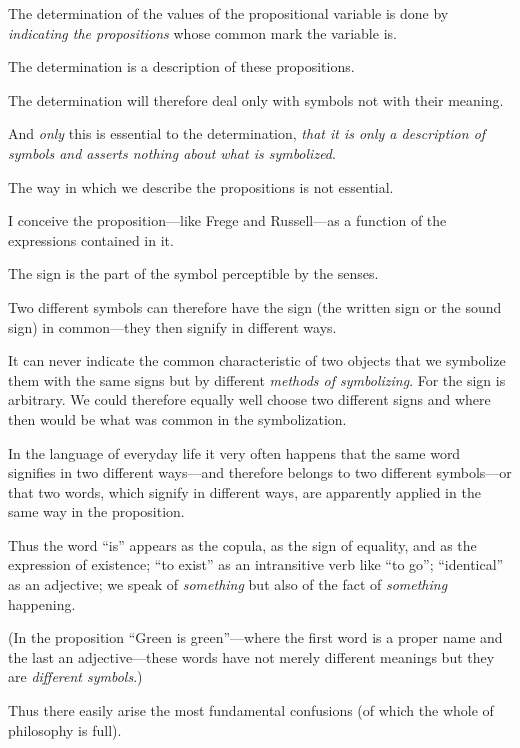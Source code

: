 {The determination of the values of the propositional
variable is done by \emph{indicating the propositions}
whose common mark the variable is.

The determination is a description of these
propositions.

The determination will therefore deal only with
symbols not with their meaning.

And \emph{only} this is essential to the determination,
\emph{that it is only a description of symbols and asserts
nothing about what is symbolized}.

The way in which we describe the propositions
is not essential.}


{I conceive the proposition---like Frege and
Russell---as a function of the expressions contained
in it.}


{The sign is the part of the symbol perceptible
by the senses.}


{Two different symbols can therefore have the
sign (the written sign or the sound sign) in
common---they then signify in different ways.}


{It can never indicate the common characteristic
of two objects that we symbolize them with the
same signs but by different \emph{methods of symbolizing}.
For the sign is arbitrary. We could therefore
equally well choose two different signs and
where then would be what was common in the
symbolization.}


{In the language of everyday life it very often
happens that the same word signifies in two different
ways---and therefore belongs to two different
symbols---or that two words, which signify in
different ways, are apparently applied in the same
way in the proposition.

Thus the word ``is'' appears as the copula,
as the sign of equality, and as the expression of
existence; ``to exist'' as an intransitive verb like
``to go''; ``identical'' as an adjective; we speak
of \emph{something} but also of the fact of \emph{something}
happening.

(In the proposition ``Green is green''---where
the first word is a proper name and the last an
adjective---these words have not merely different
meanings but they are \emph{different symbols}.)}


{Thus there easily arise the most fundamental
confusions (of which the whole of philosophy is
full).}


